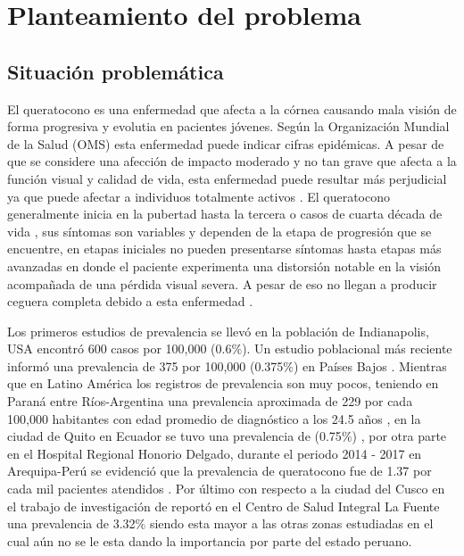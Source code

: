 \tableofcontents
\newpage

\section{Planteamiento del problema}
\subsection{Situación problemática}
El queratocono es una enfermedad que afecta a la córnea causando mala visión de forma progresiva y evolutia en pacientes jóvenes. Según la Organización Mundial de la Salud (OMS) esta enfermedad puede indicar cifras epidémicas. A pesar de que se considere una afección de impacto moderado y no tan grave que afecta a la función visual y calidad de vida, esta enfermedad puede resultar más perjudicial ya que puede afectar a individuos totalmente activos \parencite{thalasselis1988keratoconus}. El queratocono generalmente inicia en la pubertad hasta la tercera o casos de cuarta década de vida \parencite{althomali2018prevalence}, sus síntomas son variables y dependen de la etapa de progresión que se encuentre, en etapas iniciales no pueden presentarse síntomas hasta etapas más avanzadas en donde el paciente experimenta una distorsión notable en la visión acompañada de una pérdida visual severa. A pesar de eso no llegan a producir ceguera completa debido a esta enfermedad \parencite{rabinowitz1998keratoconus}. 

Los primeros estudios de prevalencia se llevó en la población de Indianapolis, USA encontró 600 casos por 100,000 (0.6$\%$). Un estudio poblacional más reciente informó una prevalencia de 375 por 100,000 (0.375$\%$) en Países Bajos \parencite{godefrooij2017age}. Mientras que en Latino América  los registros de prevalencia son muy pocos, teniendo en Paraná entre Ríos-Argentina una prevalencia aproximada de 229 por cada 100,000 habitantes con edad promedio de diagnóstico a los 24.5 años \parencite{pussetto2011alta}, en la ciudad de Quito en Ecuador se tuvo una prevalencia de (0.75$\%$) \parencite{mansfield2017queratocono}, por otra parte en el Hospital Regional Honorio Delgado, durante el periodo 2014 - 2017 en Arequipa-Perú se evidenció que la prevalencia de queratocono fue de 1.37 por cada mil pacientes atendidos \parencite{ramos2018prevalencia}. Por último con respecto a la ciudad del Cusco en el trabajo de investigación de \textcite{samaniego2023prevalencia} reportó en el Centro de Salud Integral La Fuente una prevalencia de 3.32$\%$ siendo esta mayor a las otras zonas estudiadas en el cual aún no se le esta dando la importancia por parte del estado peruano.

